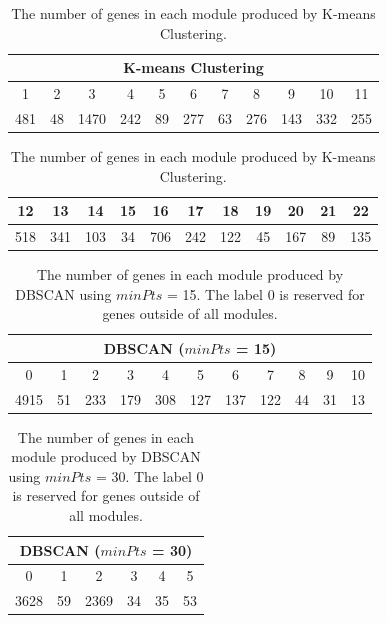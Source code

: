 \documentclass[sigconf,authordraft]{acmart}
\begin{document}
\begin{table}[H]
\begin{center}
\begin{tabular}{|c|c|c|c|c|c|c|c|c|c|c|}
\hline
\multicolumn{11}{|c|}{K-means Clustering} \tabularnewline
\hline
1 & 2 & 3 & 4 & 5 & 6 & 7 & 8 & 9 & 10 & 11\\
\hline
481 & 48 & 1470 & 242 & 89 & 277 & 63 & 276 & 143 & 332 & 255\\
\hline
\end{tabular}
\end{center}

\begin{center}
\begin{tabular}{|c|c|c|c|c|c|c|c|c|c|c|}
\hline
12 & 13 & 14 & 15 & 16 & 17 & 18 & 19 & 20 & 21 & 22\\
\hline
518 & 341 & 103 & 34 & 706 & 242 & 122 & 45 & 167 & 89 & 135\\
\hline
\end{tabular}
\end{center}
\caption{The number of genes in each module produced by K-means Clustering.}
\end{table}

\begin{table}[H]
\begin{center}
\begin{tabular}{|c|c|c|c|c|c|c|c|c|c|c|}
\hline
\multicolumn{11}{|c|}{DBSCAN ($minPts$ = 15)} \tabularnewline
\hline
0 & 1 & 2 & 3 & 4 & 5 & 6 & 7 & 8 & 9 & 10\\
\hline
4915 & 51 & 233 & 179 & 308 & 127 & 137 & 122 & 44 & 31 & 13\\
\hline
\end{tabular}
\end{center}
\caption{The number of genes in each module produced by DBSCAN using $minPts$ = 15. The label 0 is reserved for genes outside of all modules.}
\end{table}

\begin{table}[H]
\begin{center}
\begin{tabular}{|c|c|c|c|c|c|}
\hline
\multicolumn{6}{|c|}{DBSCAN ($minPts$ = 30)} \tabularnewline
\hline
0 & 1 & 2 & 3 & 4 & 5\\
\hline
3628 & 59 & 2369 & 34 & 35 & 53\\
\hline
\end{tabular}
\end{center}
\caption{The number of genes in each module produced by DBSCAN using $minPts$ = 30. The label 0 is reserved for genes outside of all modules.}
\end{table}
\end{document}
